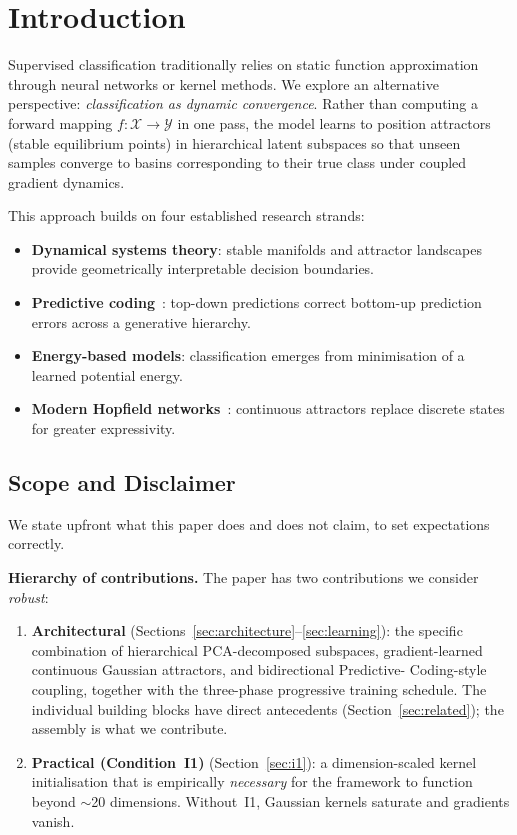 \documentclass[11pt,a4paper]{article}
\begin{document}
\section{Introduction}

Supervised classification traditionally relies on static function approximation through
neural networks or kernel methods. We explore an alternative perspective:
\emph{classification as dynamic convergence}. Rather than computing a forward mapping
$f : \mathcal{X} \to \mathcal{Y}$ in one pass, the model learns to position attractors
(stable equilibrium points) in hierarchical latent subspaces so that unseen samples
converge to basins corresponding to their true class under coupled gradient dynamics.

This approach builds on four established research strands:
\begin{itemize}
  \item \textbf{Dynamical systems theory}: stable manifolds and attractor landscapes provide
        geometrically interpretable decision boundaries.
  \item \textbf{Predictive coding}~\cite{rao1999predictive,friston2005theory}: top-down
        predictions correct bottom-up prediction errors across a generative hierarchy.
  \item \textbf{Energy-based models}: classification emerges from minimisation of a learned
        potential energy.
  \item \textbf{Modern Hopfield networks}~\cite{ramsauer2021hopfield}: continuous attractors
        replace discrete states for greater expressivity.
\end{itemize}

\subsection{Scope and Disclaimer}
\label{sec:scope}

We state upfront what this paper does and does not claim, to set expectations correctly.

\textbf{Hierarchy of contributions.} The paper has two contributions we consider
\emph{robust}:
\begin{enumerate}
  \item \textbf{Architectural} (Sections~\ref{sec:architecture}--\ref{sec:learning}):
        the specific combination of hierarchical PCA-decomposed subspaces,
        gradient-learned continuous Gaussian attractors, and bidirectional Predictive-
        Coding-style coupling, together with the three-phase progressive training
        schedule. The individual building blocks have direct antecedents
        (Section~\ref{sec:related}); the assembly is what we contribute.
  \item \textbf{Practical (Condition~I1)} (Section~\ref{sec:i1}): a dimension-scaled
        kernel initialisation that is empirically \emph{necessary} for the framework
        to function beyond $\sim$20 dimensions. Without~I1, Gaussian kernels saturate
        and gradients vanish.
\end{enumerate}
\end{document}
